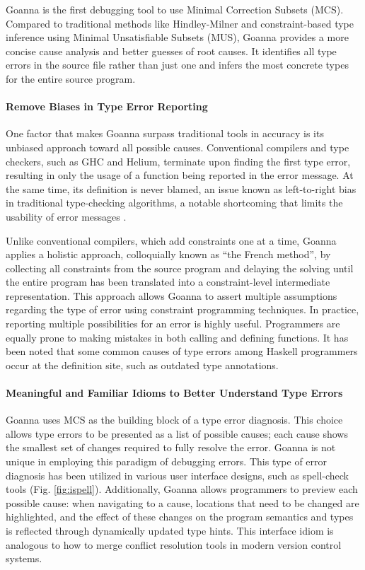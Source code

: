 \documentclass[pdflatex,lineno,sn-nature,Numbered]{sn-jnl}%
\begin{document}
Goanna is the first debugging tool to use Minimal Correction Subsets (MCS). Compared to traditional methods like Hindley-Milner and constraint-based type inference using Minimal Unsatisfiable Subsets (MUS), Goanna provides a more concise cause analysis and better guesses of root causes. It identifies all type errors in the source file rather than just one and infers the most concrete types for the entire source program.

\paragraph{Remove Biases in Type Error Reporting}

One factor that makes Goanna surpass traditional tools in accuracy is its unbiased approach toward all possible causes. Conventional compilers and type checkers, such as GHC and Helium, terminate upon finding the first type error, resulting in only the usage of a function being reported in the error message. At the same time, its definition is never blamed, an issue known as left-to-right bias in traditional type-checking algorithms, a notable shortcoming that limits the usability of error messages \cite{McAdam2002-vb, Lee1998-fx, Chen2014-ev}. 

Unlike conventional compilers, which add constraints one at a time, Goanna applies a holistic approach, colloquially known as ``the French method'', by collecting all constraints from the source program and delaying the solving until the entire program has been translated into a constraint-level intermediate representation. This approach allows Goanna to assert multiple assumptions regarding the type of error using constraint programming techniques. In practice, reporting multiple possibilities for an error is highly useful. Programmers are equally prone to making mistakes in both calling and defining functions. It has been noted that some common causes of type errors among Haskell programmers occur at the definition site, such as outdated type annotations.

\paragraph{Meaningful and Familiar Idioms to Better Understand Type Errors}

Goanna uses MCS as the building block of a type error diagnosis. This choice allows type errors to be presented as a list of possible causes; each cause shows the smallest set of changes required to fully resolve the error. Goanna is not unique in employing this paradigm of debugging errors. This type of error diagnosis has been utilized in various user interface designs, such as spell-check tools (Fig. \ref{fig:ispell}). Additionally, Goanna allows programmers to preview each possible cause: when navigating to a cause, locations that need to be changed are highlighted, and the effect of these changes on the program semantics and types is reflected through dynamically updated type hints. This interface idiom is analogous to how to merge conflict resolution tools in modern version control systems.
\end{document}
